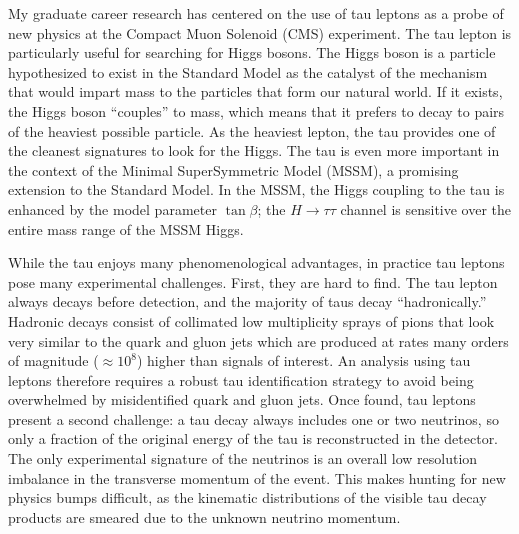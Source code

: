 \documentclass{scrartcl}        %
\date{}
\newcommand{\Sep}{\vspace{2em}}
\begin{document}
\thispagestyle{empty}
\begin{cv}{}
\enlargethispage{\baselineskip}
\Sep




My graduate career research has centered on the use of tau leptons as a probe of
new physics at the Compact Muon Solenoid (CMS) experiment.  The tau lepton is
particularly useful for searching for Higgs bosons.  The Higgs boson is a
particle hypothesized to exist in the Standard Model as the catalyst of the
mechanism that would impart mass to the particles that form our natural world.
If it exists, the Higgs boson ``couples'' to mass, which means that it prefers
to decay to pairs of the heaviest possible particle.  As the heaviest lepton,
the tau provides one of the cleanest signatures to look for the Higgs.  The tau
is even more important in the context of the Minimal SuperSymmetric Model
(MSSM), a promising extension to the Standard Model.  In the MSSM, the Higgs
coupling to the tau is enhanced by the model parameter $\tan\beta$; the
$H\to\tau\tau$ channel is sensitive over the entire mass range of the MSSM
Higgs. 

While the tau enjoys many phenomenological advantages, in practice tau leptons
pose many experimental challenges.  First, they are hard to find.  The tau
lepton always decays before detection, and the
majority of taus decay ``hadronically.'' Hadronic decays consist of collimated
low multiplicity sprays of pions that look very similar to
the quark and gluon jets which are produced at rates many orders of magnitude
($\approx 10^8$) higher than signals of interest.  An analysis using tau leptons
therefore requires a robust tau identification strategy to avoid being
overwhelmed by misidentified quark and gluon jets.  Once found, tau leptons
present a second challenge: a tau decay always includes one or two neutrinos, so
only a fraction of the original energy of the tau is reconstructed in the
detector.  The only experimental signature of the neutrinos is an overall low
resolution imbalance in the transverse momentum of the event.  This makes
hunting for new physics bumps difficult, as the kinematic distributions of the
visible tau decay products are smeared due to the unknown neutrino momentum.


\end{cv}
\end{document}
